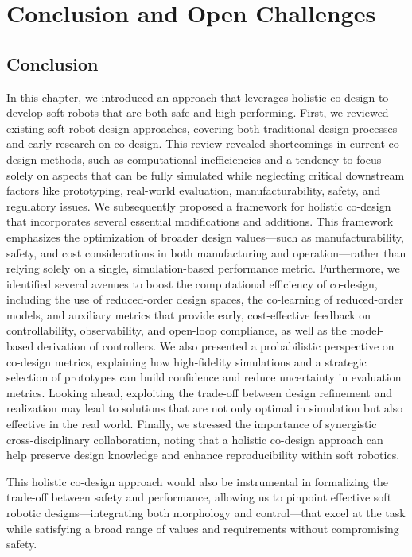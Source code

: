 \section{Conclusion and Open Challenges}

\subsection{Conclusion}
In this chapter, we introduced an approach that leverages holistic co-design to develop soft robots that are both safe and high-performing.
First, we reviewed existing soft robot design approaches, covering both traditional design processes and early research on co-design. This review revealed shortcomings in current co-design methods, such as computational inefficiencies and a tendency to focus solely on aspects that can be fully simulated while neglecting critical downstream factors like prototyping, real-world evaluation, manufacturability, safety, and regulatory issues. We subsequently proposed a framework for holistic co-design that incorporates several essential modifications and additions. This framework emphasizes the optimization of broader design values—such as manufacturability, safety, and cost considerations in both manufacturing and operation—rather than relying solely on a single, simulation-based performance metric.
Furthermore, we identified several avenues to boost the computational efficiency of co-design, including the use of reduced-order design spaces, the co-learning of reduced-order models, and auxiliary metrics that provide early, cost-effective feedback on controllability, observability, and open-loop compliance, as well as the model-based derivation of controllers. We also presented a probabilistic perspective on co-design metrics, explaining how high-fidelity simulations and a strategic selection of prototypes can build confidence and reduce uncertainty in evaluation metrics. Looking ahead, exploiting the trade-off between design refinement and realization may lead to solutions that are not only optimal in simulation but also effective in the real world. Finally, we stressed the importance of synergistic cross-disciplinary collaboration, noting that a holistic co-design approach can help preserve design knowledge and enhance reproducibility within soft robotics.

This holistic co-design approach would also be instrumental in formalizing the trade-off between safety and performance, allowing us to pinpoint effective soft robotic designs—integrating both morphology and control—that excel at the task while satisfying a broad range of values and requirements without compromising safety.

